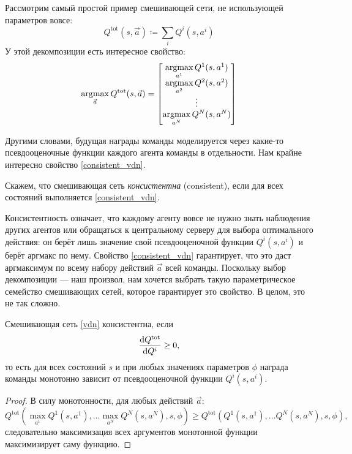\begin{example} Рассмотрим самый простой пример смешивающей сети, не использующей параметров вовсе:
$$Q^{\mathrm{tot}}(s, \vec{a}) \coloneqq \sum_i Q^i(s, a^i)$$
У этой декомпозиции есть интересное свойство: 
\begin{equation}\label{consistent_vdn}
\mathop{\mathrm{argmax}}_{\vec{a}} Q^{\mathrm{tot}}(s, \vec{a}) = \left[ 
\begin{matrix}
\mathop{\mathrm{argmax}}\limits_{a^1} Q^1(s, a^1) \\
\mathop{\mathrm{argmax}}\limits_{a^2} Q^2(s, a^2) \\
\vdots \\
\mathop{\mathrm{argmax}}\limits_{a^N} Q^N(s, a^N) \\
\end{matrix}
\right]
\end{equation}
\end{example}

Другими словами, будущая награды команды моделируется через какие-то псевдооценочные функции каждого агента команды в отдельности. Нам крайне интересно свойство \eqref{consistent_vdn}.

\begin{definition}
Скажем, что смешивающая сеть \emph{консистентна} (consistent), если для всех состояний выполняется \eqref{consistent_vdn}.
\end{definition}

Консистентность означает, что каждому агенту вовсе не нужно знать наблюдения других агентов или обращаться к центральному серверу для выбора оптимального действия: он берёт лишь значение свой псевдооценочной функции $Q^i(s, a^i)$ и берёт аргмакс по нему. Свойство \eqref{consistent_vdn} гарантирует, что это даст аргмаксимум по всему набору действий $\vec{a}$ всей команды. Поскольку выбор декомпозиции --- наш произвол, нам хочется выбрать такую параметрическое семейство смешивающих сетей, которое гарантирует это свойство. В целом, это не так сложно.

\begin{theorem}
Смешивающая сеть \eqref{vdn} консистентна, если
\begin{equation}\label{qmix_condition}
\frac{\mathop{}\!\mathrm{d} Q^{\mathrm{tot}}}{\mathop{}\!\mathrm{d} Q^i} \ge 0,
\end{equation}
то есть для всех состояний $s$ и при любых значениях параметров $\phi$ награда команды монотонно зависит от псевдооценочной функции $Q^i(s, a^i)$.
\begin{proof}
В силу монотонности, для любых действий $\vec{a}$:
$$Q^{\mathrm{tot}}( \max_{a^1} Q^1(s, a^1), \dots \max_{a^N} Q^N(s, a^N), s, \phi) \ge Q^{\mathrm{tot}}( Q^1(s, a^1), \dots Q^N(s, a^N), s, \phi),$$
следовательно максимизация всех аргументов монотонной функции максимизирует саму функцию.
\end{proof}
\end{theorem}

